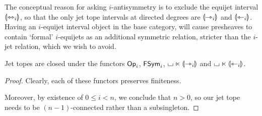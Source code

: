 \documentclass[a4paper]{memoir}
\begin{document}
The conceptual reason for asking $i$-antisymmetry is to exclude the equijet interval ${\llparenthesis {\leftrightarrowtriangle}_i \rrparenthesis}$, so that the only jet tope intervals at directed degrees are ${\llparenthesis {\rightarrowtriangle}_i \rrparenthesis}$ and ${\llparenthesis {\leftarrowtriangle}_i \rrparenthesis}$.
Having an $i$-equijet interval object in the base category, will cause presheaves to contain `formal' $i$-equijets as an additional symmetric relation, stricter than the $i$-jet relation, which we wish to avoid.
\begin{proposition} \label{thm:lift-to-jet-topes}
	Jet topes are closed under the functors ${\mathsf{Op}}_i$, $\mathsf{FSym}_i$,
	${\llcorner\hspace{-.4ex}\lrcorner} \ltimes {\llparenthesis \rightarrowtriangle_i \rrparenthesis}$ and ${\llcorner\hspace{-.4ex}\lrcorner} \ltimes {\llparenthesis \leftarrowtriangle_i \rrparenthesis}$.
\end{proposition}
\begin{proof}
	Clearly, each of these functors preserves finiteness.
	
	Moreover, by existence of $0 \leq i < n$, we conclude that $n > 0$, so our jet tope needs to be $(n-1)$-connected rather than a subsingleton.
	

\end{proof}
\end{document}
